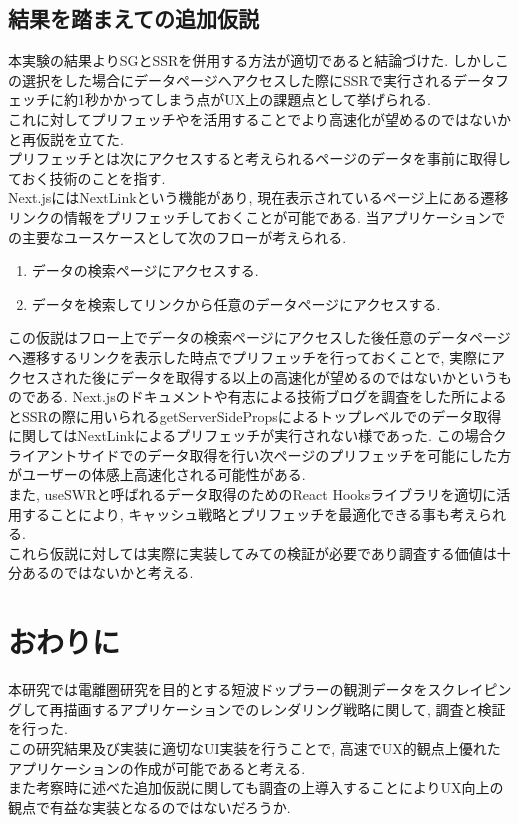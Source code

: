 \subsection{結果を踏まえての追加仮説}
本実験の結果よりSGとSSRを併用する方法が適切であると結論づけた.
しかしこの選択をした場合にデータページへアクセスした際にSSRで実行されるデータフェッチに約1秒かかってしまう点がUX上の課題点として挙げられる.\\
これに対してプリフェッチやを活用することでより高速化が望めるのではないかと再仮説を立てた.\\
プリフェッチとは次にアクセスすると考えられるページのデータを事前に取得しておく技術のことを指す.\\
Next.jsにはNextLinkという機能があり, 現在表示されているページ上にある遷移リンクの情報をプリフェッチしておくことが可能である.
当アプリケーションでの主要なユースケースとして次のフローが考えられる.\\
\begin{enumerate}
	\item データの検索ページにアクセスする.
	\item データを検索してリンクから任意のデータページにアクセスする.
\end{enumerate}
この仮説はフロー上でデータの検索ページにアクセスした後任意のデータページヘ遷移するリンクを表示した時点でプリフェッチを行っておくことで, 実際にアクセスされた後にデータを取得する以上の高速化が望めるのではないかというものである.
Next.jsのドキュメントや有志による技術ブログを調査をした所によるとSSRの際に用いられるgetServerSidePropsによるトップレベルでのデータ取得に関してはNextLinkによるプリフェッチが実行されない様であった.
この場合クライアントサイドでのデータ取得を行い次ページのプリフェッチを可能にした方がユーザーの体感上高速化される可能性がある.\\
また, useSWRと呼ばれるデータ取得のためのReact Hooksライブラリを適切に活用することにより, キャッシュ戦略とプリフェッチを最適化できる事も考えられる.\\
これら仮説に対しては実際に実装してみての検証が必要であり調査する価値は十分あるのではないかと考える.

\section{おわりに}
本研究では電離圏研究を目的とする短波ドップラーの観測データをスクレイピングして再描画するアプリケーションでのレンダリング戦略に関して, 調査と検証を行った.\\
この研究結果及び実装に適切なUI実装を行うことで, 高速でUX的観点上優れたアプリケーションの作成が可能であると考える.\\
また考察時に述べた追加仮説に関しても調査の上導入することによりUX向上の観点で有益な実装となるのではないだろうか.